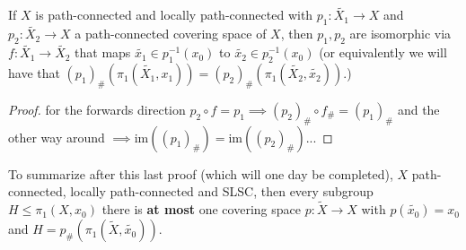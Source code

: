 \begin{boxlemma}
    If $X$ is path-connected and locally path-connected with $p_1:\tilde{X_1}\rightarrow X$ and $p_2:\tilde{X_2}\rightarrow X$ a path-connected covering space of $X$, then $p_1, p_2$ are isomorphic via $f:\tilde{X_1}\rightarrow \tilde{X_2}$ that maps $\tilde{x_1}\in p_1^{-1}(x_0)$ to $\tilde{x_2}\in p_2^{-1}(x_0)$ (or equivalently we will have that $(p_1)_{\#}(\pi_1(\tilde{X_1}, x_1))=(p_2)_{\#}(\pi_1(\tilde{X_2}, \tilde{x_2}))$.)
\end{boxlemma}
\begin{proof}
    for the forwards direction $p_2\circ f=p_1\implies (p_2)_{\#}\circ f_{\#}=(p_1)_{\#}$ and the other way around $\implies \text{im}((p_1)_{\#})=\text{im}((p_2)_{\#})$...\sorry
\end{proof}
To summarize after this last proof (which will one day be completed), $X$ path-connected, locally path-connected and SLSC, then every subgroup $H\leq \pi_1(X, x_0)$ there is \textbf{at most} one covering space $p:\tilde{X}\rightarrow X$ with $p(\tilde{x_0})=x_0$ and $H=p_{\#}(\pi_1(\tilde{X}, \tilde{x_0}))$. 

